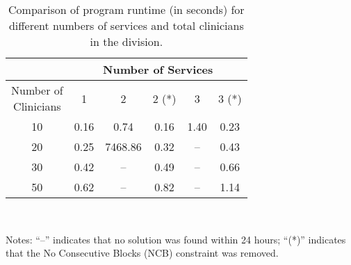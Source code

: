 \begin{table}[htbp]
	\centering
 	\caption{Comparison of program runtime (in seconds) for different numbers of services and total clinicians in the division.}%
  \label{tbl:runtime-services-clinicians-comparison}%
	\begin{tabular}{|c|c||c|c||c|c|}
		\toprule
		                                      &  \multicolumn{5}{c|}{Number of Services}  \\ \midrule
		\makecell[l]{Number of \\ Clinicians} &  1   &    2    & 2 (*) &  3   & 3 (*) \\ \midrule
		                 10                   & 0.16 &  0.74   &  0.16   & 1.40 &  0.23   \\ \hline
		                 20                   & 0.25 & 7468.86 &  0.32   &  --  &  0.43   \\ \hline
		                 30                   & 0.42 &    --   &  0.49   &  --  &  0.66   \\ \hline
		                 50                   & 0.62 &    --   &  0.82   &  --  &  1.14   \\ \bottomrule
	\end{tabular}\\[1em]
  \footnotesize\raggedright
  Notes:
  ``--'' indicates that no solution was found within 24 hours;
  ``(*)'' indicates that the No Consecutive Blocks (NCB) constraint was removed.
\end{table}